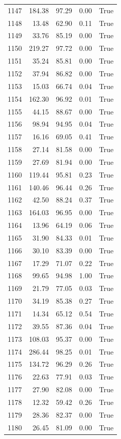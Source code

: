 \begin{longtable}{rrrrr}
1147 & 184.38 & 97.29 & 0.00 & True \\
1148 & 13.48 & 62.90 & 0.11 & True \\
1149 & 33.76 & 85.19 & 0.00 & True \\
1150 & 219.27 & 97.72 & 0.00 & True \\
1151 & 35.24 & 85.81 & 0.00 & True \\
1152 & 37.94 & 86.82 & 0.00 & True \\
1153 & 15.03 & 66.74 & 0.04 & True \\
1154 & 162.30 & 96.92 & 0.01 & True \\
1155 & 44.15 & 88.67 & 0.00 & True \\
1156 & 98.94 & 94.95 & 0.04 & True \\
1157 & 16.16 & 69.05 & 0.41 & True \\
1158 & 27.14 & 81.58 & 0.00 & True \\
1159 & 27.69 & 81.94 & 0.00 & True \\
1160 & 119.44 & 95.81 & 0.23 & True \\
1161 & 140.46 & 96.44 & 0.26 & True \\
1162 & 42.50 & 88.24 & 0.37 & True \\
1163 & 164.03 & 96.95 & 0.00 & True \\
1164 & 13.96 & 64.19 & 0.06 & True \\
1165 & 31.90 & 84.33 & 0.01 & True \\
1166 & 30.10 & 83.39 & 0.00 & True \\
1167 & 17.29 & 71.07 & 0.22 & True \\
1168 & 99.65 & 94.98 & 1.00 & True \\
1169 & 21.79 & 77.05 & 0.03 & True \\
1170 & 34.19 & 85.38 & 0.27 & True \\
1171 & 14.34 & 65.12 & 0.54 & True \\
1172 & 39.55 & 87.36 & 0.04 & True \\
1173 & 108.03 & 95.37 & 0.00 & True \\
1174 & 286.44 & 98.25 & 0.01 & True \\
1175 & 134.72 & 96.29 & 0.26 & True \\
1176 & 22.63 & 77.91 & 0.03 & True \\
1177 & 27.90 & 82.08 & 0.00 & True \\
1178 & 12.32 & 59.42 & 0.26 & True \\
1179 & 28.36 & 82.37 & 0.00 & True \\
1180 & 26.45 & 81.09 & 0.00 & True \\

\end{longtable}
